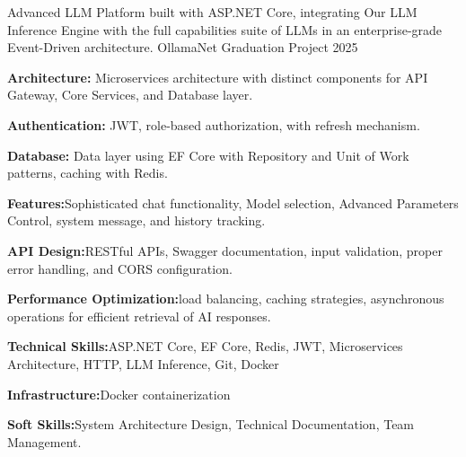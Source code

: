 

\begin{cventries}
\cventry
    {Advanced LLM Platform built with ASP.NET Core, integrating Our LLM Inference Engine with the full capabilities suite of LLMs in an enterprise-grade Event-Driven architecture.
    } %
    {OllamaNet} %
    {Graduation Project} %
    {2025} %
    {
      \begin{cvitems} %
        \item \textbf{Architecture:}{ Microservices architecture with distinct components for API Gateway, Core Services, and Database layer.}
        \item \textbf{Authentication:}{ JWT,  role-based authorization, with refresh mechanism.}
        \item \textbf{Database:}{ Data layer using EF Core with Repository and Unit of Work patterns, caching with Redis.}
        \item \textbf{Features:}{Sophisticated chat functionality, Model selection, Advanced Parameters Control, system message, and history tracking.}
        \item \textbf{API Design:}{RESTful APIs, Swagger documentation, input validation, proper error handling, and CORS configuration.}
        \item \textbf{Performance Optimization:}{load balancing,  caching strategies, asynchronous operations for efficient retrieval of AI responses.}
        \item \textbf{Technical Skills:}{ASP.NET Core, EF Core, Redis, JWT, Microservices Architecture, HTTP, LLM Inference, Git, Docker}
        \item \textbf{Infrastructure:}{Docker containerization}        \item \textbf{Soft Skills:}{System Architecture Design, Technical Documentation, Team Management.}
      \end{cvitems}
    }


\end{cventries}

